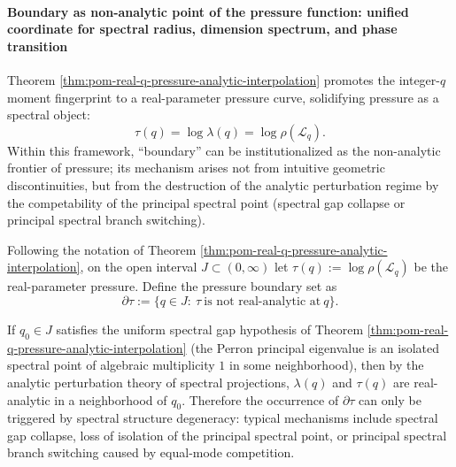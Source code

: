 
\paragraph{Boundary as non-analytic point of the pressure function: unified coordinate for spectral radius, dimension spectrum, and phase transition}
Theorem \ref{thm:pom-real-q-pressure-analytic-interpolation} promotes the integer-\(q\) moment fingerprint to a real-parameter pressure curve, solidifying pressure as a spectral object:
\[
\tau(q)=\log\lambda(q)=\log\rho(\mathcal L_q).
\]
Within this framework, ``boundary'' can be institutionalized as the non-analytic frontier of pressure; its mechanism arises not from intuitive geometric discontinuities, but from the destruction of the analytic perturbation regime by the competability of the principal spectral point (spectral gap collapse or principal spectral branch switching).

\begin{definition}\label{def:pom-pressure-nonanalytic-boundary}
Following the notation of Theorem \ref{thm:pom-real-q-pressure-analytic-interpolation}, on the open interval \(J\subset(0,\infty)\) let
\(
\tau(q):=\log\rho(\mathcal L_q)
\)
be the real-parameter pressure.
Define the pressure boundary set as
\[
\partial\tau:=\{q\in J:\ \tau\ \text{is not real-analytic at}\ q\}.
\]
\end{definition}

\begin{remark}\label{rem:pom-nonanalyticity-as-spectral-gap-closure}
If \(q_0\in J\) satisfies the uniform spectral gap hypothesis of Theorem \ref{thm:pom-real-q-pressure-analytic-interpolation} (the Perron principal eigenvalue is an isolated spectral point of algebraic multiplicity \(1\) in some neighborhood), then by the analytic perturbation theory of spectral projections, \(\lambda(q)\) and \(\tau(q)\) are real-analytic in a neighborhood of \(q_0\).
Therefore the occurrence of \(\partial\tau\) can only be triggered by spectral structure degeneracy: typical mechanisms include spectral gap collapse, loss of isolation of the principal spectral point, or principal spectral branch switching caused by equal-mode competition.
\end{remark}

